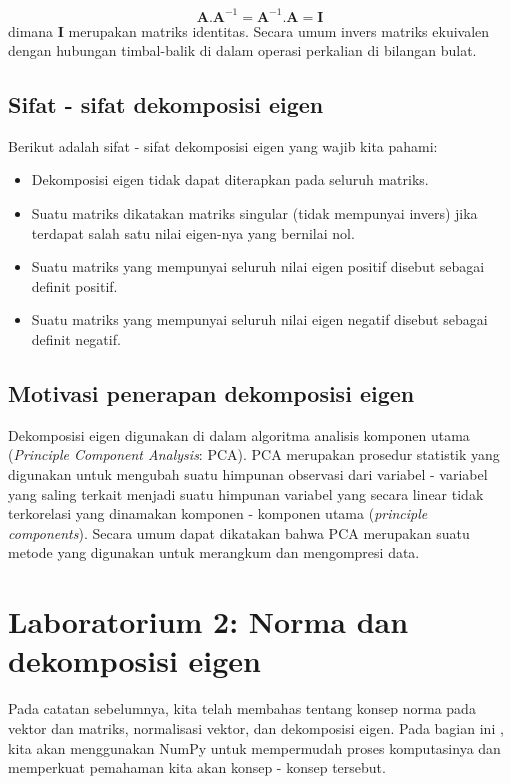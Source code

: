\begin{equation}\label{eqn:eqn18}
    \mathbf{A}.\mathbf{A}^{-1} = \mathbf{A}^{-1}.\mathbf{A} = \mathbf{I} 
\end{equation}
dimana $\mathbf{I}$ merupakan matriks identitas. Secara umum invers matriks ekuivalen dengan hubungan timbal-balik di dalam operasi perkalian di bilangan bulat.

\subsection{Sifat - sifat dekomposisi eigen}
Berikut adalah sifat - sifat dekomposisi eigen yang wajib kita pahami:


\begin{itemize}
    \item Dekomposisi eigen tidak dapat diterapkan pada seluruh matriks.
    \item Suatu matriks dikatakan matriks singular (tidak mempunyai invers) jika terdapat salah satu nilai eigen-nya yang bernilai nol.
    \item Suatu matriks yang mempunyai seluruh nilai eigen positif disebut sebagai definit positif.
    \item Suatu matriks yang mempunyai seluruh nilai eigen negatif disebut sebagai definit negatif.
\end{itemize}

\subsection{Motivasi penerapan dekomposisi eigen}
Dekomposisi eigen digunakan di dalam algoritma analisis komponen utama (\textit{Principle Component Analysis}: PCA). PCA merupakan prosedur statistik yang digunakan untuk mengubah suatu himpunan observasi dari variabel - variabel yang saling terkait menjadi suatu himpunan variabel yang secara linear tidak terkorelasi yang dinamakan komponen - komponen utama (\textit{principle components}). Secara umum dapat dikatakan bahwa PCA merupakan suatu metode yang digunakan untuk merangkum dan mengompresi data.

\section{Laboratorium 2: Norma dan dekomposisi eigen}
Pada catatan sebelumnya, kita telah membahas tentang konsep norma pada vektor dan matriks, normalisasi vektor, dan dekomposisi eigen. Pada bagian ini , kita akan menggunakan NumPy untuk mempermudah proses komputasinya dan memperkuat pemahaman kita akan konsep - konsep tersebut.

